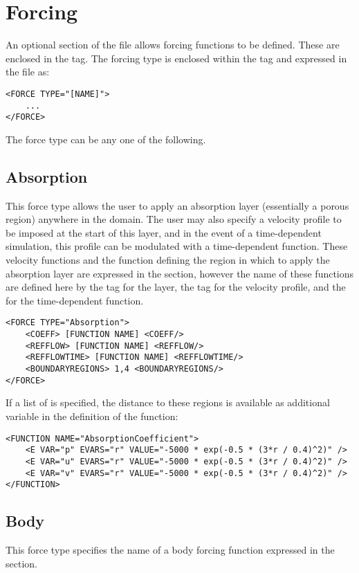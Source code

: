 \section{Forcing}
\label{sec:xml:forcing}
An optional section of the file allows forcing functions to be defined. These are enclosed in the
 tag. The forcing type is enclosed within the  tag and expressed in the file as:

\begin{lstlisting}[style=XMLStyle] 
<FORCE TYPE="[NAME]">
    ...
</FORCE>
\end{lstlisting}

The force type can be any one of the following.

\subsection{Absorption}
This force type allows the user to apply an absorption layer (essentially a porous region) anywhere in the domain. The user may also specify a velocity profile to be imposed at the start of this layer, and in the event of a time-dependent simulation, this profile can be modulated with a time-dependent function. These velocity functions and the function defining the region in which to apply the absorption layer are expressed in the  section, however the name of these functions are defined here by the  tag for the layer, the  tag for the velocity profile, and the  for the time-dependent function.  

\begin{lstlisting}[style=XMLStyle] 
<FORCE TYPE="Absorption">
    <COEFF> [FUNCTION NAME] <COEFF/>
    <REFFLOW> [FUNCTION NAME] <REFFLOW/>
    <REFFLOWTIME> [FUNCTION NAME] <REFFLOWTIME/>
    <BOUNDARYREGIONS> 1,4 <BOUNDARYREGIONS/>
</FORCE>
\end{lstlisting}
If a list of  is specified, the distance to these regions is available as additional variable  in the definition of the  function:
\begin{lstlisting}[style=XMLStyle]
<FUNCTION NAME="AbsorptionCoefficient">
    <E VAR="p" EVARS="r" VALUE="-5000 * exp(-0.5 * (3*r / 0.4)^2)" />
    <E VAR="u" EVARS="r" VALUE="-5000 * exp(-0.5 * (3*r / 0.4)^2)" />
    <E VAR="v" EVARS="r" VALUE="-5000 * exp(-0.5 * (3*r / 0.4)^2)" />
</FUNCTION>
\end{lstlisting}

\subsection{Body}
This force type specifies the name of a body forcing function expressed in the  section.

